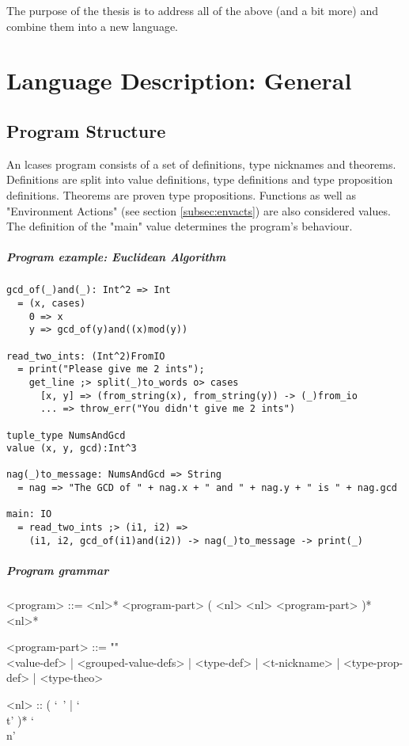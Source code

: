 \documentclass[diploma]{softlab-thesis}
\begin{document}
The purpose of the thesis is to address all of the above (and a bit more) and
combine them into a new language.

\chapter{Language Description: General}

\section{Program Structure}

An lcases program consists of a set of definitions, type nicknames and
theorems.  Definitions are split into value definitions, type definitions and
type proposition definitions. Theorems are proven type propositions. Functions
as well as "Environment Actions" (see section \ref{subsec:envacts}) are also
considered values. The definition of the "main" value determines the program's
behaviour.

\paragraph{Program example: Euclidean Algorithm}
\begin{verbatim}
gcd_of(_)and(_): Int^2 => Int
  = (x, cases)
    0 => x
    y => gcd_of(y)and((x)mod(y))

read_two_ints: (Int^2)FromIO
  = print("Please give me 2 ints");
    get_line ;> split(_)to_words o> cases
      [x, y] => (from_string(x), from_string(y)) -> (_)from_io
      ... => throw_err("You didn't give me 2 ints")

tuple_type NumsAndGcd
value (x, y, gcd):Int^3

nag(_)to_message: NumsAndGcd => String
  = nag => "The GCD of " + nag.x + " and " + nag.y + " is " + nag.gcd

main: IO
  = read_two_ints ;> (i1, i2) =>
    (i1, i2, gcd_of(i1)and(i2)) -> nag(_)to_message -> print(_)
\end{verbatim}

\paragraph{Program grammar}
\begin{grammar}
<program> ::=
<nl>* <program-part> ( <nl> <nl> <program-part> )* <nl>*

<program-part> ::= ""\\
<value-def> | <grouped-value-defs> | <type-def> | <t-nickname> |
<type-prop-def> | <type-theo>

<nl> :: ( `\ ' | `\\t' )* `\\n'
\end{grammar}
\end{document}
